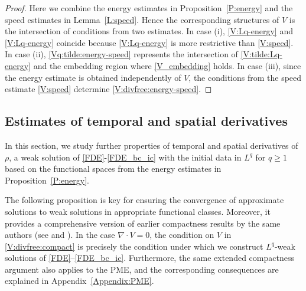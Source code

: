 \documentclass{amsart}
\numberwithin{equation}{section}
\begin{document}
\begin{proof}
	Here we combine the energy estimates in Proposition~\ref{P:energy} and the speed estimates in Lemma~\ref{L:speed}. Hence the corresponding structures of $V$ is the intersection of conditions from two estimates. 
	In case (i), \eqref{V:Lq-energy} and \eqref{V:Lq-energy} coincide because \eqref{V:Lq-energy} is more restrictive than \eqref{V:speed}. In case (ii), \eqref{Vq:tilde:energy-speed} represents the intersection of \eqref{V:tilde:Lq-energy} and the embedding region where \eqref{V_embedding} holds. In case (iii), since the energy estimate is obtained independently of $V$, the conditions from the speed estimate \eqref{V:speed} determine \eqref{V:divfree:energy-speed}.
\end{proof}



\subsection{Estimates of temporal and spatial derivatives} 

In this section, we study further properties of temporal and spatial derivatives of $\rho$, a weak solution of \eqref{FDE}-\eqref{FDE_bc_ic} with the initial data in $L^q$ for $q\geq 1$ based on the functional spaces from the energy estimates in Proposition~\ref{P:energy}. 

The following proposition is key for ensuring the convergence of approximate solutions to weak solutions in appropriate functional classes.
Moreover, it provides a comprehensive version of earlier compactness results by the same authors (see \cite[Section~4.4]{HKK01} and \cite[Section~4.3]{HKK02}). In the case \(\nabla\cdot V=0\), the condition on \(V\) in \eqref{V:divfree:compact} is precisely the condition under which we construct \(L^q\)-weak solutions of \eqref{FDE}--\eqref{FDE_bc_ic}. Furthermore, the same extended compactness argument also applies to the PME, and the corresponding consequences are explained in Appendix~\ref{Appendix:PME}.
 
\end{document}
